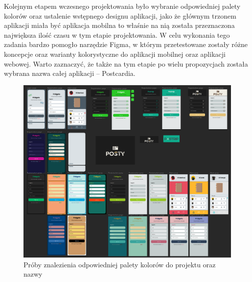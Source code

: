 \documentclass[a4paper,twoside,12pt]{book}
\begin{document}
Kolejnym etapem wczesnego projektowania było wybranie odpowiedniej palety kolorów oraz ustalenie wstępnego designu aplikacji, jako że głównym trzonem aplikacji miała być aplikacja mobilna to właśnie na nią została przeznaczona największa ilość czasu w tym etapie projektowania. W celu wykonania tego zadania bardzo pomogło narzędzie Figma, w którym przetestowane zostały różne koncepcje oraz warianty kolorystyczne do aplikacji mobilnej oraz aplikacji webowej. Warto zaznaczyć, że także na tym etapie po wielu propozycjach została wybrana nazwa całej aplikacji -- Postcardia.
\begin{figure}[H]
    \centering
    \includegraphics[width=1\textwidth]{wizje_ss/figma-colors.png}
    \caption{Próby znalezienia odpowiedniej palety kolorów do projektu oraz nazwy}
\end{figure}
\newpage
\end{document}
